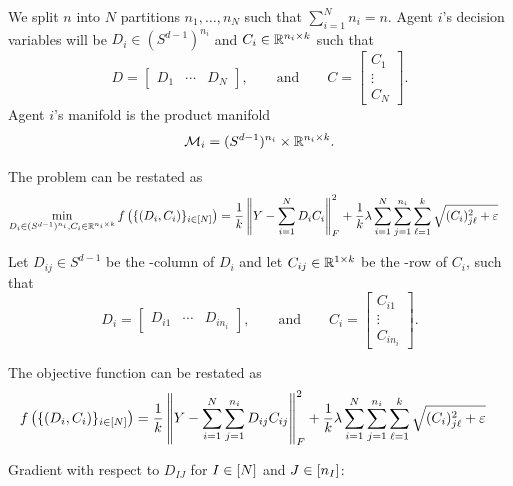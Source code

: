 We split $n$ into $N$ partitions $n_1,\dots,n_N$ such that $\sum_{i=1}^N n_i = n$.
Agent $i$'s decision variables will be 
$D_i\in (S^{d-1})^{n_i}$ and $C_i\in\mathbb{R}^{n_i\times k}$ such that
\begin{equation}
    D = \begin{bmatrix}
        D_1 & \cdots & D_N
    \end{bmatrix},
    \qquad\text{and}\qquad
    C = \begin{bmatrix}
        C_1 \\ \vdots \\ C_N
    \end{bmatrix}.
\end{equation}
Agent $i$'s manifold is the product manifold
\begin{equation}
    \mathcal{M}_i = (S^{d-1})^{n_i} \times \mathbb{R}^{n_i\times k}.
\end{equation}

The problem can be restated as
\begin{align}
    \min_{D_i\in(S^{d-1})^{n_i}, C_i\in\mathbb{R}^{n_i\times k}} f\left(\{(D_i,C_i)\}_{i\in[N]}\right)
    &= \frac{1}{k} \left\lVert Y - \sum_{i=1}^N D_i C_i \right\rVert_F^2 + \frac{1}{k} \lambda \sum_{i=1}^N \sum_{j=1}^{n_i} \sum_{\ell=1}^k \sqrt{(C_i)_{j\ell}^2 + \varepsilon}
\end{align}

Let $D_{ij}\in S^{d-1}$ be the -column of $D_i$ and let $C_{ij}\in\mathbb{R}^{1\times k}$ be the -row of $C_i$, such that
\begin{equation}
    D_i=\begin{bmatrix}
        D_{i1} & \cdots & D_{in_i}
    \end{bmatrix},
\qquad\text{and}\qquad
    C_i = \begin{bmatrix}
        C_{i1} \\ \vdots \\ C_{in_i}
    \end{bmatrix}.
\end{equation}

The objective function can be restated as
\begin{align}
    f\left(\{(D_i,C_i)\}_{i\in[N]}\right)
    &= \frac{1}{k} \left\lVert Y - \sum_{i=1}^N \sum_{j=1}^{n_i} D_{ij} C_{ij} \right\rVert_F^2 + \frac{1}{k} \lambda \sum_{i=1}^N \sum_{j=1}^{n_i} \sum_{\ell=1}^k \sqrt{(C_i)_{j\ell}^2 + \varepsilon}
\end{align}

Gradient with respect to $D_{IJ}$ for $I\in[N]$ and $J\in[n_I]$:

